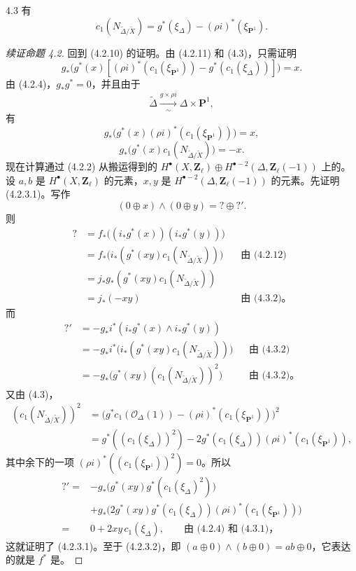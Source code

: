 \begin{SGAresult}{}{4.3}
有
\[
 c_1(N_{\widetilde\Delta/\widetilde X})=g^*(\xi_\Delta)-(\rho i)^*(\xi_{\mathbf P^1}).
\]
\end{SGAresult}
\begin{proof}[续证命题 4.2]
回到 (4.2.10) 的证明。由 (4.2.11) 和 (4.3)，只需证明
\[
 g_*\bigl(g^*(x)[(\rho i)^*(c_1(\xi_{\mathbf P^1}))-g^*(c_1(\xi_\Delta))]\bigr)=x.
\]
由 (4.2.4)，$g_*g^*=0$，并且由于
\[
 \widetilde\Delta\xrightarrow[\sim]{g\times\rho i}\Delta\times\mathbf P^1,
\]
有
\[
 g_*\bigl(g^*(x)(\rho i)^*(c_1(\xi_{\mathbf P^1}))\bigr)=x,\tag{4.3.1}
\]
\[
 g_*\bigl(g^*(x)c_1(N_{\widetilde\Delta/\widetilde X})\bigr)=-x.\tag{4.3.2}
\]
现在计算通过 (4.2.2) 从搬运得到的 $H^\bullet(X,\mathbf Z_\ell)\oplus H^{\bullet-2}(\Delta,\mathbf Z_\ell(-1))$ 上的。设 $a,b$ 是 $H^\bullet(X,\mathbf Z_\ell)$ 的元素，$x,y$ 是 $H^{\bullet-2}(\Delta,\mathbf Z_\ell(-1))$ 的元素。先证明 (4.2.3.1)。写作
\[
 (0\oplus x)\wedge(0\oplus y)=?\oplus?'.
\]
则
\[
\begin{aligned}
?&=f_*\bigl((i_*g^*(x))(i_*g^*(y))\bigr)\\
 &=f_*\bigl(i_*(g^*(xy)c_1(N_{\widetilde\Delta/\widetilde X}))\bigr)&&\text{由 (4.2.12)}\\
 &=j_*g_*(g^*(xy)c_1(N_{\widetilde\Delta/\widetilde X}))\\
 &=j_*(-xy)&&\text{由 (4.3.2)。}
\end{aligned}
\]
而
\[
\begin{aligned}
?'&=-g_*i^*(i_*g^*(x)\wedge i_*g^*(y))\\
 &=-g_*i^*\bigl(i_*(g^*(xy)c_1(N_{\widetilde\Delta/\widetilde X}))\bigr)&&\text{由 (4.3.2)}\\
 &=-g_*\bigl(g^*(xy)(c_1(N_{\widetilde\Delta/\widetilde X}))^2\bigr)&&\text{由 (4.3.2)。}
\end{aligned}
\]
又由 (4.3)，
\[
\begin{aligned}
(c_1(N_{\widetilde\Delta/\widetilde X}))^2
 &=\bigl(g^*c_1(\mathscr O_\Delta(1))-(\rho i)^*(c_1(\xi_{\mathbf P^1}))\bigr)^2\\
 &=g^*((c_1(\xi_\Delta))^2)-2g^*(c_1(\xi_\Delta))(\rho i)^*(c_1(\xi_{\mathbf P^1})),
\end{aligned}
\]
其中余下的一项 $(\rho i)^*((c_1(\xi_{\mathbf P^1}))^2)=0$。所以
\[
\begin{aligned}
?'={}&-g_*\bigl(g^*(xy)g^*(c_1(\xi_\Delta)^2)\bigr)\\
 &+g_*\bigl(2g^*(xy)g^*(c_1(\xi_\Delta))(\rho i)^*(c_1(\xi_{\mathbf P^1}))\bigr)\\
={}&0+2xy\,c_1(\xi_\Delta),\qquad\text{由 (4.2.4) 和 (4.3.1)，}
\end{aligned}
\]
这就证明了 (4.2.3.1)。至于 (4.2.3.2)，即 $(a\oplus0)\wedge(b\oplus0)=ab\oplus0$，它表达的就是 $f^*$ 是。


\end{proof}
